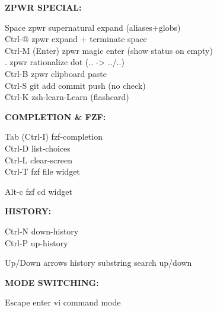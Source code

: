 \documentclass[11pt,a4paper,twoside]{book}
\begin{document}
\vspace{12pt}
{\bfseries\color{neonyellow} ZPWR SPECIAL:}\vspace{4pt}

\begin{codebox}
Space                 zpwr supernatural expand (aliases+globs)\\
Ctrl-@                zpwr expand + terminate space\\
Ctrl-M (Enter)        zpwr magic enter (show status on empty)\\
.                     zpwr rationalize dot (.. -> ../..)\\
Ctrl-B                zpwr clipboard paste\\
Ctrl-S                git add commit push (no check)\\
Ctrl-K                zsh-learn-Learn (flashcard)\\
\end{codebox}


\vspace{12pt}
{\bfseries\color{neonyellow} COMPLETION \& FZF:}\vspace{4pt}

\begin{codebox}
Tab (Ctrl-I)          fzf-completion\\
Ctrl-D                list-choices\\
Ctrl-L                clear-screen\\
Ctrl-T                fzf file widget\\
\end{codebox}

Alt-c                 fzf cd widget


\vspace{12pt}
{\bfseries\color{neonyellow} HISTORY:}\vspace{4pt}

\begin{codebox}
Ctrl-N                down-history\\
Ctrl-P                up-history\\
\end{codebox}

Up/Down arrows        history substring search up/down


\vspace{12pt}
{\bfseries\color{neonyellow} MODE SWITCHING:}\vspace{4pt}

Escape                enter vi command mode
\end{document}
